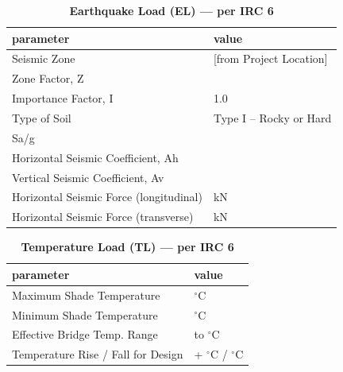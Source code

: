 \documentclass[12pt,a4paper]{report}
\numberwithin{table}{chapter}
\numberwithin{figure}{chapter}
\begin{document}
\vspace{1em}
\begin{longtable}{|L{5.5cm}|p{10.0cm}|}
\caption{\textbf{Earthquake Load (EL) --- per IRC 6}}\\
\hline
\textbf{parameter} & \textbf{value} \\
\hline
\textnormal{Seismic Zone} &  [from Project Location] \\[6pt]
\hline
\textnormal{Zone Factor, Z} &  \\[6pt]
\hline
\textnormal{Importance Factor, I} & 1.0 \\[6pt]
\hline
\textnormal{Type of Soil} & Type I – Rocky or Hard \\[6pt]
\hline
\textnormal{Sa/g} &  \\[6pt]
\hline
\textnormal{Horizontal Seismic Coefficient, Ah} &  \\[6pt]
\hline
\textnormal{Vertical Seismic Coefficient, Av} &  \\[6pt]
\hline
\textnormal{Horizontal Seismic Force (longitudinal)} &  kN \\[6pt]
\hline
\textnormal{Horizontal Seismic Force (transverse)} &  kN \\[6pt]
\hline
\end{longtable}

\vspace{1em}
\begin{longtable}{|L{5.5cm}|p{10.0cm}|}
\caption{\textbf{Temperature Load (TL) --- per IRC 6}}\\
\hline
\textbf{parameter} & \textbf{value} \\
\hline
\textnormal{Maximum Shade Temperature} &  $^\circ$C \\[6pt]
\hline
\textnormal{Minimum Shade Temperature} &  $^\circ$C \\[6pt]
\hline
\textnormal{Effective Bridge Temp. Range} &  to  $^\circ$C \\[6pt]
\hline
\textnormal{Temperature Rise / Fall for Design} & + $^\circ$C / \textminus{} $^\circ$C \\[6pt]
\hline
\end{longtable}
\end{document}
